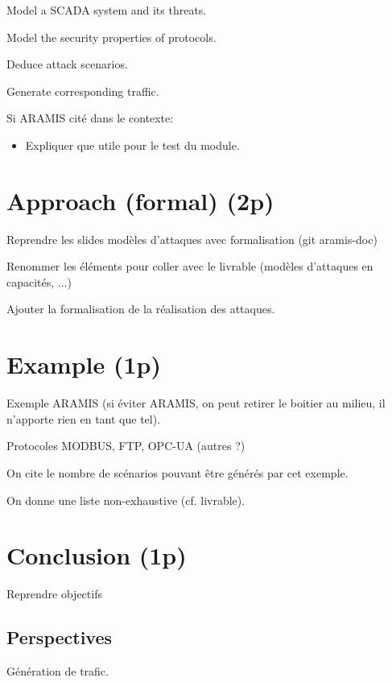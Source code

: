 \documentclass[11pt]{article}
\begin{document}
Model a SCADA system and its threats.

Model the security properties of protocols.

Deduce attack scenarios.

Generate corresponding traffic.

Si ARAMIS cité dans le contexte:
\begin{itemize}
    \item Expliquer que utile pour le test du module.
\end{itemize}

\section{Approach (formal) (2p)}

Reprendre les slides modèles d'attaques avec formalisation (git aramis-doc)

Renommer les éléments pour coller avec le livrable (modèles d'attaques en capacités, ...)

Ajouter la formalisation de la réalisation des attaques.

\section{Example (1p)}

Exemple ARAMIS (si éviter ARAMIS, on peut retirer le boitier au milieu,
il n'apporte rien en tant que tel).

Protocoles MODBUS, FTP, OPC-UA (autres ?)

On cite le nombre de scénarios pouvant être générés par cet exemple.

On donne une liste non-exhaustive (cf. livrable).

\section{Conclusion (1p)}

Reprendre objectifs

\subsection{Perspectives}

Génération de trafic.

%
%
\end{document}
